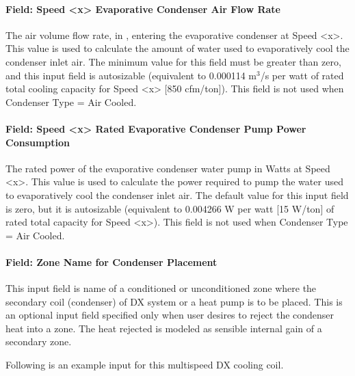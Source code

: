 \paragraph{Field: Speed \textless{}x\textgreater{} Evaporative Condenser Air Flow Rate}\label{field-speed-x-evaporative-condenser-air-flow-rate}

The air volume flow rate, in \si{\volumeFlowRate}, entering the evaporative condenser at Speed \textless{}x\textgreater{}. This value is used to calculate the amount of water used to evaporatively cool the condenser inlet air. The minimum value for this field must be greater than zero, and this input field is autosizable (equivalent to 0.000114 m\(^{3}\)/s per watt of rated total cooling capacity for Speed \textless{}x\textgreater{} {[}850 cfm/ton{]}). This field is not used when Condenser Type = Air Cooled.

\paragraph{Field: Speed \textless{}x\textgreater{} Rated Evaporative Condenser Pump Power Consumption}\label{field-speed-x-rated-evaporative-condenser-pump-power-consumption}

The rated power of the evaporative condenser water pump in Watts at Speed \textless{}x\textgreater{}. This value is used to calculate the power required to pump the water used to evaporatively cool the condenser inlet air. The default value for this input field is zero, but it is autosizable (equivalent to 0.004266 W per watt {[}15 W/ton{]} of rated total capacity for Speed \textless{}x\textgreater{}). This field is not used when Condenser Type = Air Cooled.

\paragraph{Field: Zone Name for Condenser Placement}\label{field-zone-name-for-condenser-placement-2}

This input field is name of a conditioned or unconditioned zone where the secondary coil (condenser) of DX system or a heat pump is to be placed. This is an optional input field specified only when user desires to reject the condenser heat into a zone. The heat rejected is modeled as sensible internal gain of a secondary zone.

Following is an example input for this multispeed DX cooling coil.

